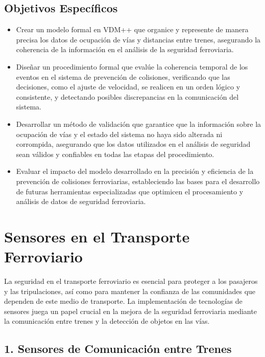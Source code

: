 \documentclass[journal]{IEEEtran}
\begin{document}
\subsection{Objetivos Específicos}  

\begin{itemize}  
    \item Crear un modelo formal en VDM++ que organice y represente de manera precisa los datos de ocupación de vías y distancias entre trenes, asegurando la coherencia de la información en el análisis de la seguridad ferroviaria.  

    \item Diseñar un procedimiento formal que evalúe la coherencia temporal de los eventos en el sistema de prevención de colisiones, verificando que las decisiones, como el ajuste de velocidad, se realicen en un orden lógico y consistente, y detectando posibles discrepancias en la comunicación del sistema.  

    \item Desarrollar un método de validación que garantice que la información sobre la ocupación de vías y el estado del sistema no haya sido alterada ni corrompida, asegurando que los datos utilizados en el análisis de seguridad sean válidos y confiables en todas las etapas del procedimiento.  

    \item Evaluar el impacto del modelo desarrollado en la precisión y eficiencia de la prevención de colisiones ferroviarias, estableciendo las bases para el desarrollo de futuras herramientas especializadas que optimicen el procesamiento y análisis de datos de seguridad ferroviaria.  
\end{itemize}  

\section{Sensores en el Transporte Ferroviario}
La seguridad en el transporte ferroviario es esencial para proteger a los pasajeros y las tripulaciones, así como para mantener la confianza de las comunidades que dependen de este medio de transporte. La implementación de tecnologías de sensores juega un papel crucial en la mejora de la seguridad ferroviaria mediante la comunicación entre trenes y la detección de objetos en las vías.  

\subsection{1. Sensores de Comunicación entre Trenes}  
\end{document}
